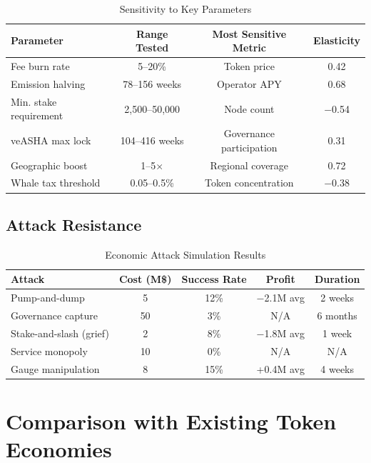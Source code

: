 \documentclass[11pt,a4paper]{article}
\begin{document}
\begin{table}[H]
\centering
\caption{Sensitivity to Key Parameters}
\label{tab:sensitivity}
\begin{tabular}{lccc}
\toprule
\textbf{Parameter} & \textbf{Range Tested} & \textbf{Most Sensitive Metric} & \textbf{Elasticity} \\
\midrule
Fee burn rate & 5--20\% & Token price & 0.42 \\
Emission halving & 78--156 weeks & Operator APY & 0.68 \\
Min. stake requirement & 2{,}500--50{,}000 & Node count & $-$0.54 \\
veASHA max lock & 104--416 weeks & Governance participation & 0.31 \\
Geographic boost & 1--5$\times$ & Regional coverage & 0.72 \\
Whale tax threshold & 0.05--0.5\% & Token concentration & $-$0.38 \\
\bottomrule
\end{tabular}
\end{table}

\subsection{Attack Resistance}

\begin{table}[H]
\centering
\caption{Economic Attack Simulation Results}
\label{tab:attacks}
\begin{tabular}{lcccc}
\toprule
\textbf{Attack} & \textbf{Cost (M\$)} & \textbf{Success Rate} & \textbf{Profit} & \textbf{Duration} \\
\midrule
Pump-and-dump & 5 & 12\% & $-$2.1M avg & 2 weeks \\
Governance capture & 50 & 3\% & N/A & 6 months \\
Stake-and-slash (grief) & 2 & 8\% & $-$1.8M avg & 1 week \\
Service monopoly & 10 & 0\% & N/A & N/A \\
Gauge manipulation & 8 & 15\% & +0.4M avg & 4 weeks \\
\bottomrule
\end{tabular}
\end{table}

\section{Comparison with Existing Token Economies}
\end{document}
